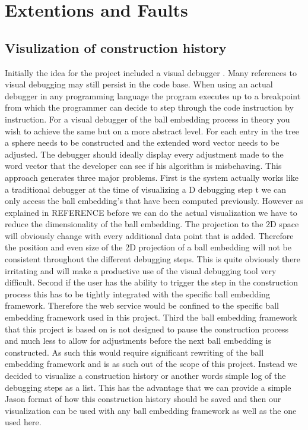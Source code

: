\documentclass[]{article}
\begin{document}
\section{Extentions and Faults}
\subsection{Visulization of construction history}
Initially the idea for the project included a visual debugger . Many references to visual debugging may still persist in the code base. When using an actual debugger in any programming language the program executes up to a breakpoint from which the programmer can decide to step through the code instruction by instruction. For a visual debugger of the ball embedding process in theory you wish to achieve the same but on a more abstract level. For each entry in the tree a sphere needs to be constructed and the extended word vector needs to be adjusted. The debugger should ideally display every adjustment made to the word vector that the developer can see if his algorithm is misbehaving. This approach generates three major problems. 
First is the system actually works like a traditional debugger at the time of visualizing a D debugging step t we can only access the ball embedding's that have been computed previously. However as explained in REFERENCE before we can do the actual visualization we have to reduce the dimensionality of the ball embedding. The projection to the 2D space will obviously change with every additional data point that is added. Therefore the position and even size of the 2D projection of a ball embedding will not be consistent throughout the different debugging steps. This is quite obviously there irritating and will make a productive use of the visual debugging tool very difficult.
Second if the user has the ability to trigger the step in the construction process this has to be tightly integrated with the specific ball embedding framework. Therefore the web service would be confined to the specific ball embedding framework used in this project. 
Third the ball embedding framework that this project is based on is not designed to pause the construction process and much less to allow for adjustments before the next ball embedding is constructed. As such this would require significant rewriting of the ball embedding framework and is as such out of the scope of this project.
Instead we decided to visualize a construction history or another words simple log of the debugging steps as a list. This has the advantage that we can provide a simple Jason format of how this construction history should be saved and then our visualization can be used with any ball embedding framework as well as the one used here.
\end{document}
